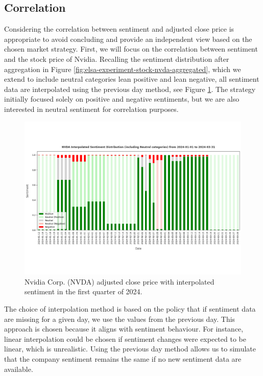 \subsection{Correlation}
\label{subsec:elsa-correlation}
Considering the correlation between sentiment and adjusted close price is appropriate to avoid concluding and provide an independent view based on the chosen market strategy. First, we will focus on the correlation between sentiment and the stock price of Nvidia. Recalling the sentiment distribution after aggregation in Figure \ref{fig:elsa-experiment-stock-nvda-aggregated}, which we extend to include neutral categories lean positive and lean negative, all sentiment data are interpolated using the previous day method, see Figure \ref{fig:elsa-experiment-stock-nvda-interpolated}. The strategy initially focused solely on positive and negative sentiments, but we are also interested in neutral sentiment for correlation purposes.

\begin{figure}[htbp]
    \centering
    \includegraphics[width=\textwidth]{img/experiment-stock/nvda-interpolated-a.pdf}
    \caption{Nvidia Corp. (NVDA) adjusted close price with interpolated sentiment in the first quarter of 2024.}
    \label{fig:elsa-experiment-stock-nvda-interpolated}
\end{figure}

The choice of interpolation method is based on the policy that if sentiment data are missing for a given day, we use the values from the previous day. This approach is chosen because it aligns with sentiment behaviour. For instance, linear interpolation could be chosen if sentiment changes were expected to be linear, which is unrealistic. Using the previous day method allows us to simulate that the company sentiment remains the same if no new sentiment data are available. 

